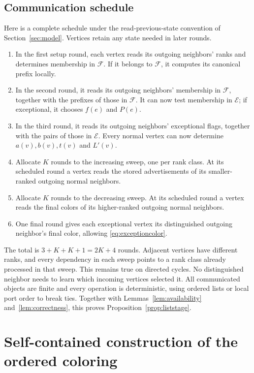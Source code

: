 \documentclass[11pt,a4paper]{article}
\numberwithin{equation}{section}
\newcommand{\full}{\mathcal F}
\newcommand{\exc}{\mathcal E}
\begin{document}
\subsection{Communication schedule}
\label{sec:schedule}

Here is a complete schedule under the read-previous-state convention
of Section~\ref{sec:model}. Vertices retain any state needed in later
rounds.
\begin{enumerate}
 \item In the first setup round, each vertex reads its outgoing
 neighbors' ranks and determines membership in \(\full\).
 If it belongs to \(\full\), it computes its canonical prefix locally.
 \item In the second round, it reads its outgoing neighbors'
 membership in \(\full\), together with the prefixes of those in
 \(\full\). It can now test
 membership in \(\exc\); if exceptional, it chooses \(f(e)\)
 and \(P(e)\).
 \item In the third round, it reads its outgoing neighbors'
 exceptional flags, together with the pairs of those in \(\exc\).
 Every normal vertex can
 now determine \(a(v),b(v),t(v)\) and \(L'(v)\).
 \item Allocate \(K\) rounds to the increasing sweep, one per
 rank class. At its scheduled round a vertex reads the stored
 advertisements of its smaller-ranked outgoing normal neighbors.
 \item Allocate \(K\) rounds to the decreasing sweep.
 At its scheduled round a vertex reads the final colors of its
 higher-ranked outgoing normal neighbors.
 \item One final round gives each exceptional vertex its
 distinguished outgoing neighbor's final color, allowing
 \eqref{eq:exceptioncolor}.
\end{enumerate}
The total is \(3+K+K+1=2K+4\) rounds.
Adjacent vertices have different ranks, and every dependency in
each sweep points to a rank class already processed in that sweep.
This remains true on directed cycles. No distinguished neighbor
needs to learn which incoming vertices selected it.
All communicated objects are finite and every operation is
deterministic, using ordered lists or local port order to break ties.
Together with Lemmas~\ref{lem:availability} and~\ref{lem:correctness},
this proves Proposition~\ref{prop:liststage}.

\section{Self-contained construction of the ordered coloring}
\label{sec:preprocessing}
\end{document}
